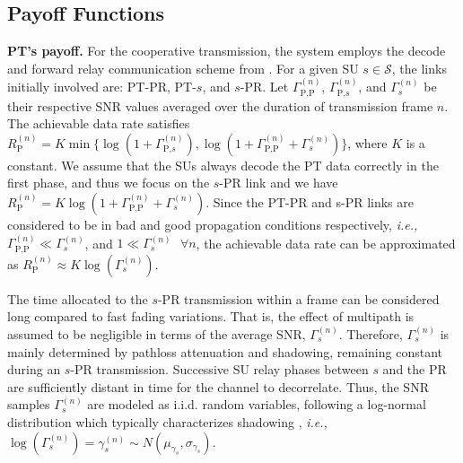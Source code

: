 \subsection {Payoff Functions}

\textbf{PT's payoff.} For the cooperative transmission, the system employs the decode and forward relay communication scheme from \cite{ref:Laneman2001}. 
For a given SU $s\in\mathcal{S}$, the links initially involved are: PT-PR, PT-$s$, and $s$-PR. Let $\Gamma_{\text{P,P}}^{(n)}$, $\Gamma_{\text{P,}s}^{(n)}$, and $\Gamma_{s}^{(n)}$ be their respective SNR values averaged over the duration of transmission frame $n$.
The achievable data rate satisfies
$R_{\text{P}}^{(n)} = K\min\{\log(1+\Gamma_{\text{P,}s}^{(n)}),\log(1+\Gamma_{\text{P,P}}^{(n)}+\Gamma_{s}^{(n)})\}$, where $K$ is a constant.
We assume that the SUs always decode the PT data correctly in the first phase, and thus we focus on the $s$-PR link and 
we have 
$R_{\text{P}}^{(n)} = K\log(1+\Gamma_{\text{P,P}}^{(n)}+\Gamma_{s}^{(n)})$.
Since the PT-PR and s-PR links are considered to be in bad and good propagation conditions respectively, \textit{i.e.,} $\Gamma_{\text{P,P}}^{(n)}\ll\Gamma_{s}^{(n)}$, and $1 \ll\Gamma_{s}^{(n)}\text{ }\forall n$, the achievable data rate can be approximated as
$R_{\text{P}}^{(n)} \approx K\log(\Gamma_{s}^{(n)})$.

The time allocated to the $s$-PR transmission within a frame can be considered long compared to fast fading variations. That is, the effect of multipath is assumed to be negligible in terms of the average SNR, $\Gamma_s^{(n)}$. Therefore, $\Gamma_s^{(n)}$ is mainly determined by pathloss attenuation and shadowing, remaining constant during an $s$-PR transmission. Successive SU relay phases between $s$ and the PR are sufficiently distant in time for the channel to decorrelate. Thus, the SNR samples $\Gamma_s^{(n)}$ are modeled as i.i.d. random variables, following a log-normal distribution which typically characterizes shadowing \cite{ref:Goldsmith2005}, \textit{i.e.,} $\log(\Gamma_s^{(n)})=\gamma_s^{(n)} \sim N(\mu_{\gamma_s},\sigma_{\gamma_s})$. 

